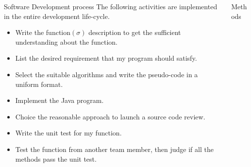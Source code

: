 \documentclass[final]{beamer}
\newlength{\onecolwid}
\newlength{\twocolwid}
\begin{document}
\begin{frame}[t]
\begin{columns}[t]
\begin{column}{\twocolwid}
\begin{columns}[t,totalwidth=\twocolwid]
\begin{column}{\onecolwid}\vspace{-.6in} %


\begin{block}{Software Development process}
The following activities are implemented in the entire development life-cycle.
\begin{itemize}
\item Write the function$(\sigma)$ description to get the sufficient understanding about the function.
\item List the desired requirement that my program should satisfy.
\item Select the suitable algorithms and write the pseudo-code in a uniform format.
\item Implement the Java program.
\item Choice the reasonable approach to launch a source code review.
\item Write the unit test for my function.
\item Test the function from another team member, then judge if all the methods pass the unit test.
\end{itemize}
\end{block}


\end{column} %

\begin{column}{\onecolwid}\vspace{-.6in} %


\begin{block}{Methods}


\end{block}
\end{column}
\end{columns}
\end{column}
\end{columns}
\end{frame}
\end{document}
